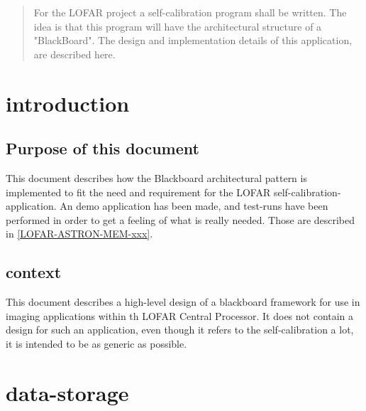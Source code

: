 \documentclass[]{lofar}
\begin{document}
  \maketitle

  \begin{abstract}

    For the LOFAR project a self-calibration program shall be
    written. The idea is that this program will have the architectural
    structure of a "BlackBoard". The design and implementation details
    of this application, are described here.
   
  \end{abstract}

  \section{introduction}
  \label{id2719843}\hypertarget{id2719843}{}%

    \subsection{Purpose of this document}
    \label{subsection-purpose}\hypertarget{subsection-purpose}{}%

      This document describes how the Blackboard architectural pattern
      is implemented to fit the need and requirement for the LOFAR
      self-calibration-application. An demo application has been made,
      and test-runs have been performed in order to get a feeling of
      what is really needed. Those are described in
      \hyperlink{LOFAR-ASTRON-MEM-xxx}{[LOFAR-ASTRON-MEM-xxx]}.

    \subsection{context}
    \label{subsection-context}\hypertarget{subsection-context}{}

      This document describes a high-level design of a blackboard
      framework for use in imaging applications within th LOFAR Central
      Processor. It does not contain a design for such an application,
      even though it refers to the self-calibration a lot, it is
      intended to be as generic as possible.

  \section{data-storage}
  \label{id2719754}\hypertarget{id2719754}{}%
\end{document}
